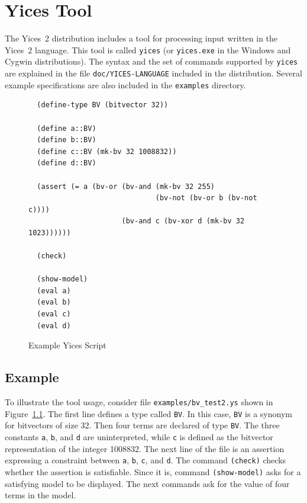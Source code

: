 \documentclass[11pt,twoside,fleqn,openright,titlepage]{cslreport}
\begin{document}
\chapter{Yices Tool}
\label{yices-shell}

The Yices~2 distribution includes  a tool for processing input written
in  the Yices~2  language.  This  tool is  called  \texttt{yices} (or
\texttt{yices.exe}  in  the Windows  and  Cygwin distributions).   The
syntax  and  the  set  of  commands supported  by  \texttt{yices}  are
explained  in  the file  \texttt{doc/YICES-LANGUAGE}  included in  the
distribution. Several example specifications  are also included in the
\texttt{examples} directory.

\begin{figure}[ht]
\begin{footnotesize}
\begin{verbatim}
  (define-type BV (bitvector 32))

  (define a::BV)
  (define b::BV)
  (define c::BV (mk-bv 32 1008832))
  (define d::BV)

  (assert (= a (bv-or (bv-and (mk-bv 32 255)
                              (bv-not (bv-or b (bv-not c))))
                      (bv-and c (bv-xor d (mk-bv 32 1023))))))

  (check)

  (show-model)
  (eval a)
  (eval b)
  (eval c)
  (eval d)
\end{verbatim}
\end{footnotesize}
\caption{Example Yices Script}
\label{example:bv_test2}
\end{figure}

\section{Example}

To      illustrate     the      tool     usage,      consider     file
\texttt{examples/bv\_test2.ys} shown in Figure~\ref{example:bv_test2}.
The  first line  defines  a  type called  \texttt{BV}.  In this  case,
\texttt{BV} is  a synonym for bitvectors  of size 32. Then  four terms
are  declared of  type \texttt{BV}.   The three  constants \texttt{a},
\texttt{b},  and \texttt{d}  are  uninterpreted,  while \texttt{c}  is
defined as  the bitvector representation  of the integer  1008832. The
next line of the file is  an assertion expressing a constraint between
\texttt{a},  \texttt{b},  \texttt{c},   and  \texttt{d}.  The  command
\texttt{(check)} checks whether the assertion is satisfiable. Since it
is, command  \texttt{(show-model)} asks for  a satisfying model  to be
displayed. The  next commands ask for  the value of four  terms in the
model.
\end{document}
